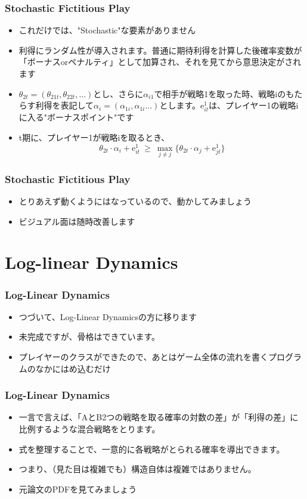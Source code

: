 \documentclass[dvipdfmx,fleqn]{beamer}
\begin{document}
\begin{frame}
\frametitle{Stochastic Fictitious Play}
\begin{itemize}\setlength{\parskip}{0.5em}
\item
これだけでは、"Stochastic"な要素がありません
\item
利得にランダム性が導入されます。普通に期待利得を計算した後確率変数が「ボーナスorペナルティ」として加算され、それを見てから意思決定がされます
\item
$\theta_{2t} = (\theta_{21t},\theta_{22t},...)$とし、さらに$\alpha_{i1}$で相手が戦略1を取った時、戦略iのもたらす利得を表記して$\alpha_i = (\alpha_{1i},\alpha_{1i}...)$とします。$ \mathrm{e}^1_{it} $は、プレイヤー1の戦略iに入る"ボーナスポイント"です
\item
t期に、プレイヤー1が戦略iを取るとき、
\[
\theta_{2t} \cdot \alpha_i +  \mathrm{e}^1_{it} \: \ge \: \max_{j \neq j} \{\theta_{2t} \cdot \alpha_j + \mathrm{e}^1_{jt} \}
\]


\end{itemize}
\end{frame}

\begin{frame}
\frametitle{Stochastic Fictitious Play}
\begin{itemize}\setlength{\parskip}{0.5em}
\item
とりあえず動くようにはなっているので、動かしてみましょう
\item
ビジュアル面は随時改善します
\end{itemize}
\end{frame}

\section{Log-linear Dynamics}
\begin{frame}
\frametitle{Log-Linear Dynamics}
\begin{itemize}\setlength{\parskip}{0.5em}
\item
つづいて、Log-Linear Dynamicsの方に移ります
\item
未完成ですが、骨格はできています。
\item
プレイヤーのクラスができたので、あとはゲーム全体の流れを書くプログラムのなかにはめ込むだけ
\end{itemize}
\end{frame}

\begin{frame}
\frametitle{Log-Linear Dynamics}
\begin{itemize}\setlength{\parskip}{0.5em}
\item
一言で言えば、「AとB2つの戦略を取る確率の対数の差」が「利得の差」に比例するような混合戦略をとります。
\item
式を整理することで、一意的に各戦略がとられる確率を導出できます。
\item
つまり、（見た目は複雑でも）構造自体は複雑ではありません。
\item
元論文のPDFを見てみましょう
\end{itemize}
\end{frame}
\end{document}
